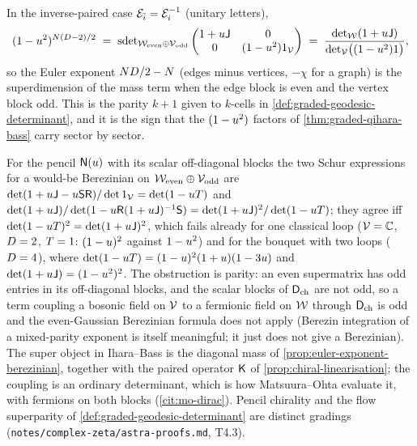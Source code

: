 \begin{proposition}
\label{prop:euler-exponent-berezinian}
In the inverse-paired case $\mathcal E_{\bar{i}} = \mathcal E_{i}^{-1}$ (unitary letters),
\[
  (1-u^2)^{N(D-2)/2} \;=\; \operatorname{sdet}_{\mathcal W_{\mathrm{even}}\oplus\mathcal V_{\mathrm{odd}}}
  \begin{pmatrix} 1+u\mathsf J & 0\\ 0 & (1-u^2)1_{\mathcal V}\end{pmatrix}
  \;=\; \frac{\det_{\mathcal W}(1+u\mathsf J)}{\det_{\mathcal V}\bigl((1-u^2)1\bigr)} ,
\]
so the Euler exponent $ND/2-N$ (edges minus vertices, $-\chi$ for a graph) is the superdimension of
the mass term when the edge block is even and the vertex block odd. This is the parity $k+1$ given to
$k$-cells in \cref{def:graded-geodesic-determinant}, and it is the sign that the $(1-u^2)$ factors of
\cref{thm:graded-qihara-bass} carry sector by sector.
\end{proposition}

\begin{proposition}
\label{prop:no-super-coupling}
For the pencil $\mathsf N(u)$ with its scalar off-diagonal blocks the two Schur expressions for a would-be
Berezinian on $\mathcal W_{\mathrm{even}}\oplus\mathcal V_{\mathrm{odd}}$ are $\det(1+u\mathsf J-u\mathsf S\mathsf R)/\det1_{\mathcal V} =
\det(1-uT)$ and $\det(1+u\mathsf J)/\det(1-u\mathsf R(1+u\mathsf J)^{-1}\mathsf S) =
\det(1+u\mathsf J)^2/\det(1-uT)$; they agree iff $\det(1-uT)^2 = \det(1+u\mathsf J)^2$, which
fails already for one classical loop ($\mathcal V = \mathbb C$, $D = 2$, $T = 1$: $(1-u)^2$ against
$1-u^2$) and for the bouquet with two loops ($D = 4$), where $\det(1-uT) =
(1-u)^2(1+u)(1-3u)$ and $\det(1+u\mathsf J) = (1-u^2)^2$. The obstruction is parity: an even
supermatrix has odd entries in its off-diagonal blocks, and the scalar blocks of $\mathsf D_{\mathrm{ch}}$ are not odd, so a
term coupling a bosonic field on $\mathcal V$ to a fermionic field on $\mathcal W$ through $\mathsf D_{\mathrm{ch}}$ is odd and the
even-Gaussian Berezinian formula does not apply (Berezin integration of a mixed-parity exponent is itself
meaningful; it just does not give a Berezinian). The super object in Ihara--Bass is the diagonal mass of
\cref{prop:euler-exponent-berezinian}, together with the paired operator $\mathsf K$ of
\cref{prop:chiral-linearisation}; the coupling is an ordinary determinant, which is how Matsuura--Ohta
evaluate it, with fermions on both blocks (\cref{cit:mo-dirac}). Pencil chirality and the flow superparity of
\cref{def:graded-geodesic-determinant} are distinct gradings (\texttt{notes/complex-zeta/astra-proofs.md}, T4.3).
\end{proposition}

